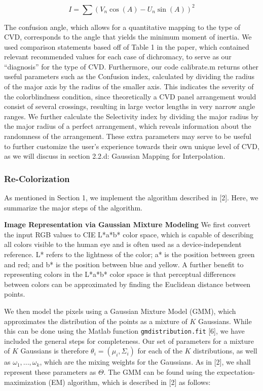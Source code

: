 \documentclass[10pt,twocolumn,letterpaper]{article}
\begin{document}
\begin{equation}\label{inertia2}
  I = \sum (V_n\cos(A) - U_n\sin(A))^{2}
\end{equation}

The confusion angle, which allows for a quantitative mapping to the type of CVD, corresponds to the angle that yields the minimum moment of inertia. We used comparison statements based off of Table 1 in the paper, which contained relevant recommended values for each case of dichromacy, to serve as our “diagnosis” for the type of CVD. Furthermore, our code calibrate.m returns other useful parameters such as the Confusion index, calculated by dividing the radius of the major axis by the radius of the smaller axis. This indicates the severity of the colorblindness condition, since theoretically a CVD panel arrangement would consist of several crossings, resulting in large vector lengths in very narrow angle ranges. We further calculate the Selectivity index by dividing the major radius by the major radius of a perfect arrangement, which reveals information about the randomness of the arrangement. These extra parameters may serve to be useful to further customize the user’s experience towards their own unique level of CVD, as we will discuss in section 2.2.d: Gaussian Mapping for Interpolation. 

\subsubsection{Re-Colorization}

As mentioned in Section 1, we implement the algorithm described in [2]. Here, we summarize the major steps of the algorithm. 

\textbf{Image Representation via Gaussian Mixture Modeling}
We first convert the input RGB values to CIE L*a*b* color space, which is capable of describing all colors visible to the human eye and is often used as a device-independent reference. L* refers to the lightness of the color; a* is the position between green and red; and b* is the position between blue and yellow. A further benefit to representing colors in the L*a*b* color space is that perceptual differences between colors can be approximated by finding the Euclidean distance between points. 

We then model the pixels using a Gaussian Mixture Model (GMM), which approximates the distribution of the points as a mixture of $K$ Gaussians. While this can be done using the Matlab function \texttt{gmdistribution.fit} [6], we have included the general steps for completeness. Our set of parameters for a mixture of $K$ Gaussians is therefore $\theta_i = (\mu_i, \Sigma_i)$ for each of the $K$ distributions, as well as $\omega_1, ..., \omega_k$, which are the mixing weights for the Gaussians. As in [2], we shall represent these parameters as $\Theta$. The GMM can be found using the expectation-maximization (EM) algorithm, which is described in [2] as follows: 
\end{document}
